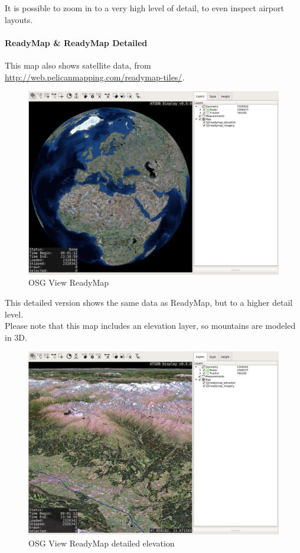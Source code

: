 It is possible to zoom in to a very high level of detail, to even inspect airport layouts.

\newpage
\paragraph{ReadyMap \& ReadyMap Detailed}

This map also shows satellite data, from \url{http://web.pelicanmapping.com/readymap-tiles/}.

\begin{figure}[H]
    \hspace*{-2.5cm}
    \includegraphics[width=19cm,frame]{../screenshots/osgview_ready.png}
  \caption{OSG View ReadyMap}
\end{figure}

This detailed version shows the same data as ReadyMap, but to a higher detail level. \\

Please note that this map includes an elevation layer, so mountains are modeled in 3D.

\begin{figure}[H]
    \hspace*{-2.5cm}
    \includegraphics[width=19cm]{../screenshots/osgview_readymap_elav.png}
  \caption{OSG View ReadyMap detailed elevation}
\end{figure}

